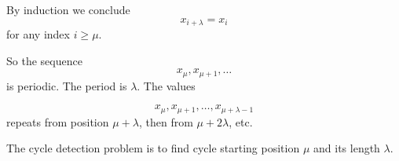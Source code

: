 \documentclass[12pt,a4paper]{article}
\begin{document}
By induction we conclude
\begin{equation}\label{eq:period}
x_{i + \lambda} = x_{i}
\end{equation}
for any index $ i \geq \mu $.

So the sequence 
\begin{equation}
x_{\mu}, x_{\mu + 1}, \ldots
\end{equation}
is periodic. The period is $ \lambda $. The values 

\begin{equation}
x_{\mu}, x_{\mu+1}, \ldots, x_{\mu + \lambda - 1}
\end{equation}
repeats from position $ \mu + \lambda $, then from $ \mu + 2 \lambda $, etc.

The cycle detection problem is to find cycle starting position $ \mu $ and its length $ \lambda $.
\end{document}
